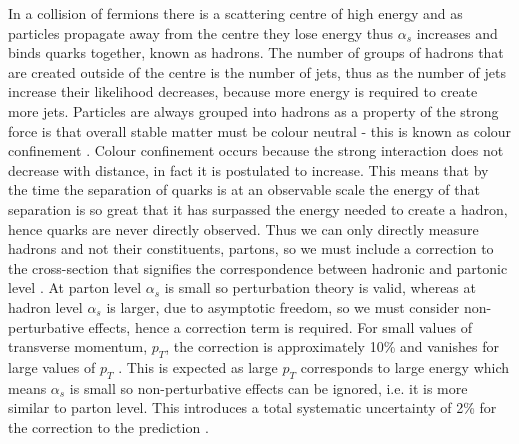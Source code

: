 \documentclass[12pt, onecolumn]{revtex4}    %
\begin{document}
In a collision of fermions there is a scattering centre of high energy and as particles propagate away from the centre they lose energy thus ${\alpha _s}$ increases and binds quarks together, known as hadrons. The number of groups of hadrons that are created outside of the centre is the number of jets, thus as the number of jets increase their likelihood decreases, because more energy is required to create more jets. Particles are always grouped into hadrons as a property of the strong force is that overall stable matter must be colour neutral - this is known as colour confinement \cite{BOOK}. Colour confinement occurs because the strong interaction does not decrease with distance, in fact it is postulated to increase. This means that by the time the separation of quarks is at an observable scale the energy of that separation is so great that it has surpassed the energy needed to create a hadron, hence quarks are never directly observed. Thus we can only directly measure hadrons and not their constituents, partons, so we must include a correction to the cross-section that signifies the correspondence between hadronic and partonic level \cite{DMP}. At parton level ${\alpha _s}$  is small so perturbation theory is valid, whereas at hadron level ${\alpha _s}$  is larger, due to asymptotic freedom, so we must consider non-perturbative effects, hence a correction term is required. For small values of transverse momentum, ${p_T}$, the correction is approximately 10\% and vanishes for large values of ${p_T}$ \cite{HEPP}. This is expected as large ${p_T}$ corresponds to large energy which means ${\alpha_s}$ is small so non-perturbative effects can be ignored, i.e. it is more similar to parton level. This introduces a total systematic uncertainty of 2\% for the correction to the prediction \cite{HEPP}. 
\end{document}
